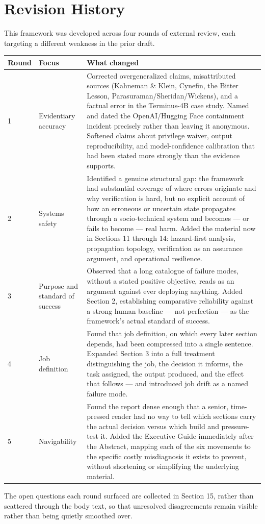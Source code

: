 \section*{Revision History}

This framework was developed across four rounds of external review, each targeting a different weakness in the prior draft.

\begin{center}
\begin{tabular}{|p{}|p{}|>{\small\raggedright\arraybackslash}p{}|}
\hline
Round & Focus & What changed \\
\hline
1 & Evidentiary accuracy & Corrected overgeneralized claims, misattributed sources (Kahneman \& Klein, Cynefin, the Bitter Lesson, Parasuraman/Sheridan/Wickens), and a factual error in the Terminus-4B case study. Named and dated the OpenAI/Hugging Face containment incident precisely rather than leaving it anonymous. Softened claims about privilege waiver, output reproducibility, and model-confidence calibration that had been stated more strongly than the evidence supports. \\
\hline
2 & Systems safety & Identified a genuine structural gap: the framework had substantial coverage of where errors originate and why verification is hard, but no explicit account of how an erroneous or uncertain state propagates through a socio-technical system and becomes --- or fails to become --- real harm. Added the material now in Sections 11 through 14: hazard-first analysis, propagation topology, verification as an assurance argument, and operational resilience. \\
\hline
3 & Purpose and standard of success & Observed that a long catalogue of failure modes, without a stated positive objective, reads as an argument against ever deploying anything. Added Section 2, establishing comparative reliability against a strong human baseline --- not perfection --- as the framework's actual standard of success. \\
\hline
4 & Job definition & Found that job definition, on which every later section depends, had been compressed into a single sentence. Expanded Section 3 into a full treatment distinguishing the job, the decision it informs, the task assigned, the output produced, and the effect that follows --- and introduced job drift as a named failure mode. \\
\hline
5 & Navigability & Found the report dense enough that a senior, time-pressed reader had no way to tell which sections carry the actual decision versus which build and pressure-test it. Added the Executive Guide immediately after the Abstract, mapping each of the six movements to the specific costly misdiagnosis it exists to prevent, without shortening or simplifying the underlying material. \\
\hline
\end{tabular}
\end{center}

The open questions each round surfaced are collected in Section 15, rather than scattered through the body text, so that unresolved disagreements remain visible rather than being quietly smoothed over.
